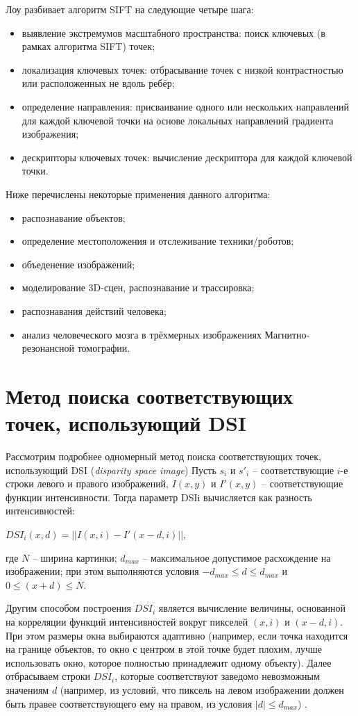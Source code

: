 Лоу разбивает алгоритм SIFT на следующие четыре шага:

\begin{itemize}
	\item выявление экстремумов масштабного пространства: поиск ключевых (в рамках алгоритма SIFT) точек;
	\item локализация ключевых точек: отбрасывание точек с низкой контрастностью или расположенных не вдоль ребёр;
	\item определение направления: присваивание одного или нескольких направлений для каждой ключевой точки на основе локальных направлений градиента изображения;
	\item дескрипторы ключевых точек: вычисление дескриптора для каждой ключевой точки.
\end{itemize}

Ниже перечислены некоторые применения данного алгоритма:

\begin{itemize}
	\item распознавание объектов;
	\item определение местоположения и отслеживание техники/роботов;
	\item объеденение изображений;
	\item моделирование 3D-сцен, распознавание и трассировка;
	\item распознавания действий человека;
	\item анализ человеческого мозга в трёхмерных изображениях Магнитно-резонансной томографии.
\end{itemize}

\section{Метод поиска соответствующих точек, использующий DSI}
Рассмотрим подробнее одномерный метод поиска
соответствующих точек, использующий DSI (\textit{disparity
space image}) \cite{6}
Пусть $s_i$ и $s'_i$ – соответствующие
$i$-е строки левого и правого изображений, $I(x,y)$ и
$I'(x,y)$ – соответствующие функции интенсивности.
Тогда параметр DSIi вычисляется как разность интенсивностей:

$DSI_i(x,d)=||I(x,i)-I'(x-d,i)||$,

где $N$ -- ширина картинки; $d_{max}$ -- максимальное допустимое расхождение на изображении; при этом выполняются условия $-d_{max} ≤ d ≤ d_{max}$ и $0 ≤ (x + d) ≤ N$.

Другим способом построения $DSI_i$ является вычисление величины, основанной на корреляции функций интенсивностей вокруг пикселей $(x,i)$ и $(x - d,i)$.
При этом размеры окна выбираются адаптивно (например, если точка находится на границе объектов, то
окно с центром в этой точке будет плохим, лучше
использовать окно, которое полностью принадлежит
одному объекту). Далее отбрасываем строки $DSI_i$,
которые соответствуют заведомо невозможным значениям $d$ (например, из условий, что пиксель на левом
изображении должен быть правее соответствующего
ему на правом, из условия $|d| ≤ d_{max}$) \cite{DSI}.


